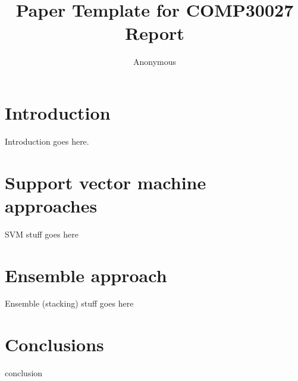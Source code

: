 \documentclass[11pt]{article}
\title{Paper Template for COMP30027 Report}
\author
{Anonymous}
\newcommand{\drafting}[1]{\textcolor{OliveGreen}{#1}}
\begin{document}
\maketitle



\section{Introduction}
\drafting{
Introduction goes here.
}

\section{Support vector machine approaches}
\drafting{
SVM stuff goes here
}

\section{Ensemble approach}

\drafting{
Ensemble (stacking) stuff goes here
}

\section{Conclusions}

\drafting{
	conclusion
}


\nocite{mukherjee_what_2013}
\nocite{rayana_collective_2015}

\nocite{sklearn_pedregosa_scikit-learn_2011}
\nocite{gensim_rehurek_software_2010}


\end{document}
